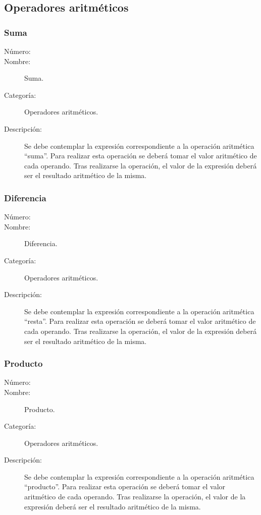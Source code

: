 \subsection{Operadores aritméticos}

\subsubsection{Suma}
\begin{framed}
	\begin{description}
		\item [Número:] \cn
		\item [Nombre:] Suma.
		\item [Categoría:] Operadores aritméticos.
		\item [Descripción:] Se debe contemplar la expresión correspondiente a la operación aritmética ``suma''. Para realizar
		esta operación se deberá tomar el valor aritmético de cada operando. Tras realizarse la operación, el valor de la expresión
		deberá ser el resultado aritmético de la misma.
	\end {description}
\end{framed}

\subsubsection{Diferencia}
\begin{framed}
	\begin{description}
		\item [Número:] \cn
		\item [Nombre:] Diferencia.
		\item [Categoría:] Operadores aritméticos.
		\item [Descripción:] Se debe contemplar la expresión correspondiente a la operación aritmética ``resta''. Para realizar
		esta operación se deberá tomar el valor aritmético de cada operando. Tras realizarse la operación, el valor de la expresión
		deberá ser el resultado aritmético de la misma.
	\end {description}
\end{framed}

\subsubsection{Producto}
\begin{framed}
	\begin{description}
		\item [Número:] \cn
		\item [Nombre:] Producto.
		\item [Categoría:] Operadores aritméticos.
		\item [Descripción:] Se debe contemplar la expresión correspondiente a la operación aritmética ``producto''. Para realizar
		esta operación se deberá tomar el valor aritmético de cada operando. Tras realizarse la operación, el valor de la expresión
		deberá ser el resultado aritmético de la misma.
	\end {description}
\end{framed}

